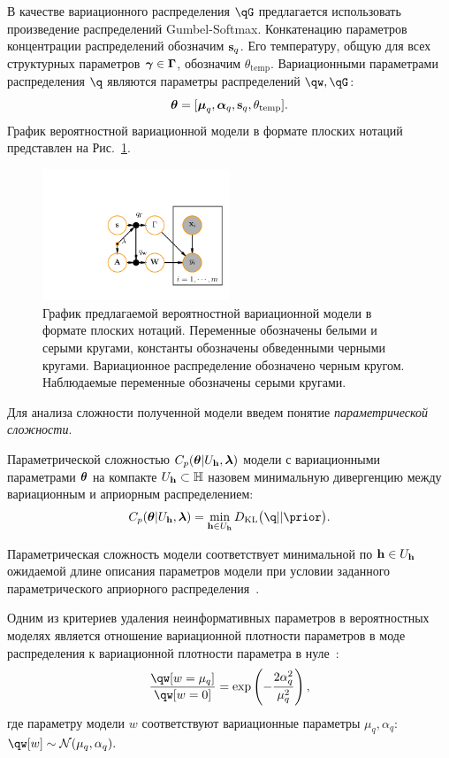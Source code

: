 В качестве вариационного распределения $\qG$ предлагается использовать произведение распределений Gumbel-Softmax. Конкатенацию параметров концентрации распределений обозначим $\mathbf{s}_q$. Его температуру, общую для всех структурных параметров $\boldsymbol{\gamma} \in \boldsymbol{\Gamma}$, обозначим $\theta_\text{temp}$.
Вариационными параметрами распределения $\q$ являются параметры распределений $\qw, \qG$:
\[\boldsymbol{\theta} =[\boldsymbol{\mu}_q, \boldsymbol{\alpha}_q,\mathbf{s}_q, \theta_\text{temp}]. 
\]
График вероятностной вариационной модели в формате плоских нотаций представлен на Рис.~\ref{fig:plate_qprob}.
\begin{figure}
\centering
   \includegraphics[width=0.5\textwidth]{plots/notebooks/plate.pdf}
\caption{График предлагаемой вероятностной вариационной модели в формате плоских нотаций. Переменные обозначены белыми и серыми кругами, константы обозначены обведенными черными кругами. Вариационное распределение обозначено черным кругом. Наблюдаемые переменные обозначены серыми кругами.}
\label{fig:plate_qprob}
\end{figure}

Для анализа сложности полученной модели введем понятие \textit{параметрической сложности}. 
\begin{defin} 
Параметрической сложностью  $C_p(\boldsymbol{\theta}|U_{\mathbf{h}}, \boldsymbol{\lambda})$ модели с вариационными параметрами $\boldsymbol{\theta}$ на компакте $U_{\mathbf{h}} \subset \mathbb{H}$ назовем минимальную дивергенцию между вариационным и априорным распределением:
\[
C_p(\teta|\Uh, \lam) = \min_{\h \in \Uh} \KL{\q}{\prior}.
\]
\end{defin}
Параметрическая сложность модели соответствует минимальной по $\mathbf{h} \in U_{\mathbf{h}}$ ожидаемой длине описания параметров модели при условии заданного параметрического априорного распределения~\cite{hinton_mdl}.

Одним из критериев удаления неинформативных параметров в вероятностных моделях является отношение вариационной плотности параметров в моде распределения к вариационной плотности параметра в нуле~\cite{nips}:
\[\frac{\qw[w=\mu_q]}{\qw[w=0]}= \text{exp}\left(-\frac{2\alpha_q^2}{\mu_q^2}\right),
\]
где параметру модели $w$ соответствуют вариационные параметры $\mu_q, \alpha_q$: $\qw[w] \sim \mathcal{N}(\mu_q, \alpha_q).$

